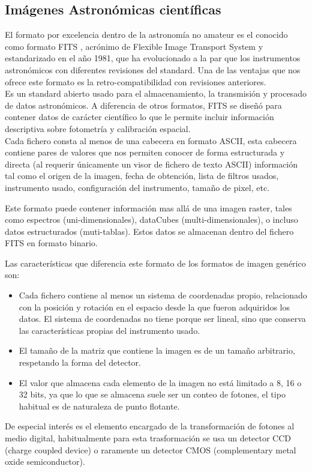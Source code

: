 	\subsection{Imágenes Astronómicas científicas}
	El formato por excelencia dentro de la astronomía no amateur es el conocido como formato FITS \cite{NasaFITS}, acrónimo de Flexible Image Transport System y estandarizado en el año 1981, que ha evolucionado a la par que los instrumentos astronómicos con diferentes revisiones del standard. Una de las ventajas que nos ofrece este formato es la retro-compatibilidad con revisiones anteriores. \\
	Es un standard abierto usado para el almacenamiento, la transmisión y procesado de datos astronómicos. A diferencia de otros formatos, FITS se diseñó para contener datos de carácter científico lo que le permite incluir información descriptiva sobre fotometría y calibración espacial.\\
	Cada fichero consta al menos de una cabecera en formato ASCII, esta cabecera contiene pares de valores que nos permiten conocer de forma estructurada y directa (al requerir únicamente un visor de fichero de texto ASCII) información tal como el origen de la imagen, fecha de obtención, lista de filtros usados, instrumento usado, configuración del instrumento, tamaño de pixel, etc. 
	
	Este formato puede contener información mas allá de una imagen raster, tales como espectros (uni-dimensionales), dataCubes (multi-dimensionales), o incluso datos estructurados (muti-tablas). Estos datos se almacenan dentro del fichero FITS en formato binario.
	
	Las características que diferencia este formato de los formatos de imagen genérico son:
	\begin{itemize}
		\item Cada fichero contiene al menos un sistema de coordenadas propio, relacionado con la posición y rotación en el espacio desde la que fueron adquiridos los datos. El sistema de coordenadas no tiene porque ser lineal, sino que conserva las características propias del instrumento usado.
		\item El tamaño de la matriz que contiene la imagen es de un tamaño arbitrario, respetando la forma del detector.
		\item El valor que almacena cada elemento de la imagen no está limitado a 8, 16 o 32 bits, ya que lo que se almacena suele ser un conteo de fotones, el tipo habitual es de naturaleza de punto flotante.
	\end{itemize}
	De especial interés es el elemento encargado de la transformación de fotones al medio digital, habitualmente para esta trasformación se usa un detector CCD (charge coupled device) o raramente un detector CMOS (complementary metal oxide semiconductor).
	
